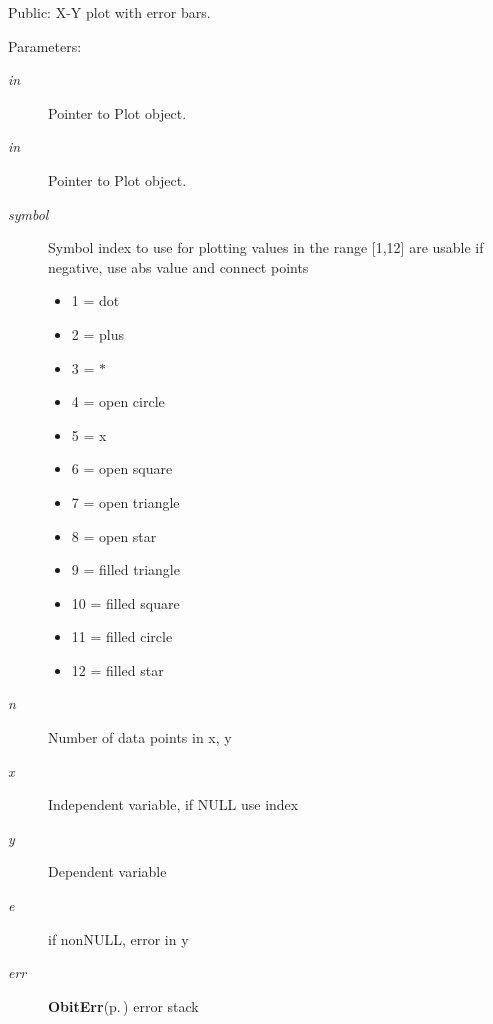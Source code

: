 Public: X-Y plot with error bars. 

\begin{Desc}
\item[Parameters:]
\begin{description}
\item[{\em in}]Pointer to Plot object. \item[{\em in}]Pointer to Plot object. \item[{\em symbol}]Symbol index to use for plotting values in the range [1,12] are usable if negative, use abs value and connect points \begin{itemize}
\item 1 = dot \item 2 = plus \item 3 = $\ast$ \item 4 = open circle \item 5 = x \item 6 = open square \item 7 = open triangle \item 8 = open star \item 9 = filled triangle \item 10 = filled square \item 11 = filled circle \item 12 = filled star\end{itemize}
\item[{\em n}]Number of data points in x, y \item[{\em x}]Independent variable, if NULL use index \item[{\em y}]Dependent variable \item[{\em e}]if non\-NULL, error in y \item[{\em err}]{\bf Obit\-Err}{\rm (p.\,\pageref{structObitErr})} error stack\end{description}
\end{Desc}
